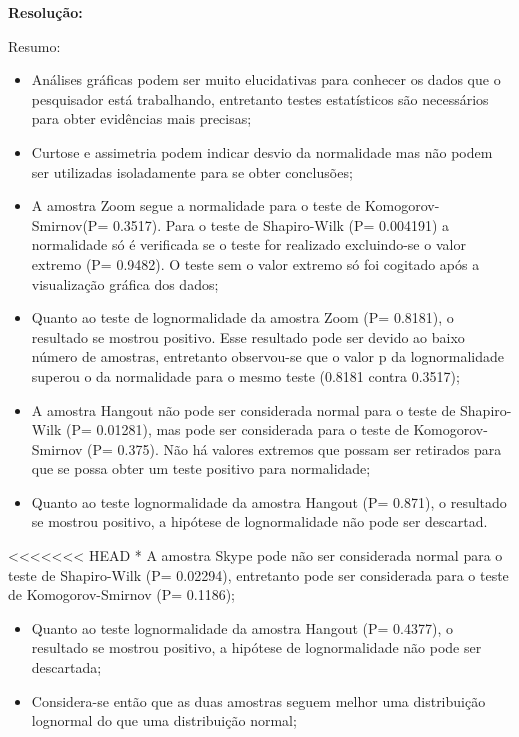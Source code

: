 \documentclass[
]{article}
\begin{document}
\textbf{Resolução:}

Resumo:

\begin{itemize}
\item
  Análises gráficas podem ser muito elucidativas para conhecer os dados
  que o pesquisador está trabalhando, entretanto testes estatísticos são
  necessários para obter evidências mais precisas;
\item
  Curtose e assimetria podem indicar desvio da normalidade mas não podem
  ser utilizadas isoladamente para se obter conclusões;
\item
  A amostra Zoom segue a normalidade para o teste de
  Komogorov-Smirnov(P= 0.3517). Para o teste de Shapiro-Wilk (P=
  0.004191) a normalidade só é verificada se o teste for realizado
  excluindo-se o valor extremo (P= 0.9482). O teste sem o valor extremo
  só foi cogitado após a visualização gráfica dos dados;
\item
  Quanto ao teste de lognormalidade da amostra Zoom (P= 0.8181), o
  resultado se mostrou positivo. Esse resultado pode ser devido ao baixo
  número de amostras, entretanto observou-se que o valor p da
  lognormalidade superou o da normalidade para o mesmo teste (0.8181
  contra 0.3517);
\item
  A amostra Hangout não pode ser considerada normal para o teste de
  Shapiro-Wilk (P= 0.01281), mas pode ser considerada para o teste de
  Komogorov-Smirnov (P= 0.375). Não há valores extremos que possam ser
  retirados para que se possa obter um teste positivo para normalidade;
\item
  Quanto ao teste lognormalidade da amostra Hangout (P= 0.871), o
  resultado se mostrou positivo, a hipótese de lognormalidade não pode
  ser descartad.
\end{itemize}

\textless\textless\textless\textless\textless\textless\textless{} HEAD *
A amostra Skype pode não ser considerada normal para o teste de
Shapiro-Wilk (P= 0.02294), entretanto pode ser considerada para o teste
de Komogorov-Smirnov (P= 0.1186);

\begin{itemize}
\item
  Quanto ao teste lognormalidade da amostra Hangout (P= 0.4377), o
  resultado se mostrou positivo, a hipótese de lognormalidade não pode
  ser descartada;
\item
  Considera-se então que as duas amostras seguem melhor uma distribuição
  lognormal do que uma distribuição normal;
\end{itemize}
\end{document}

